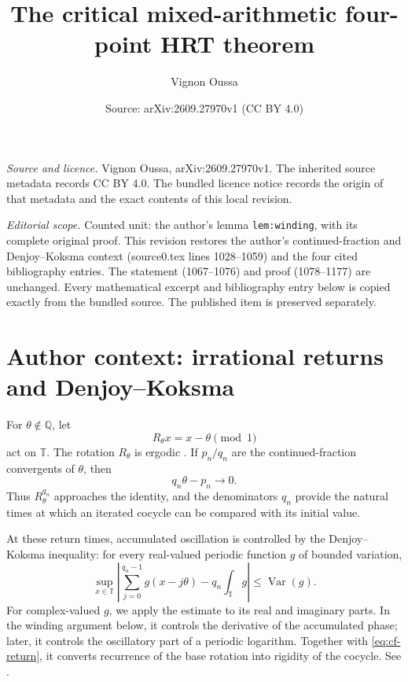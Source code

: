 \documentclass[10pt,a4paper]{amsart}
\title[The critical mixed-arithmetic four-point HRT theorem]{The critical mixed-arithmetic four-point HRT theorem}
\author{Vignon Oussa}
\date{Source: arXiv:2609.27970v1 (CC BY 4.0)}
\newcommand{\Q}{\mathbb{Q}}
\newcommand{\T}{\mathbb{T}}
\newcommand{\Var}{\operatorname{Var}}
\theoremstyle{plain}
\theoremstyle{remark}
\begin{document}
\maketitle

\noindent\emph{Source and licence.} Vignon Oussa, arXiv:2609.27970v1. The inherited source metadata records CC BY 4.0. The bundled licence notice records the origin of that metadata and the exact contents of this local revision.

\noindent\textit{Editorial scope.} Counted unit: the author's lemma \texttt{lem:winding}, with its complete original proof. This revision restores the author's continued-fraction and Denjoy--Koksma context (source0.tex lines 1028--1059) and the four cited bibliography entries. The statement (1067--1076) and proof (1078--1177) are unchanged. Every mathematical excerpt and bibliography entry below is copied exactly from the bundled source. The published item is preserved separately.

\section*{Author context: irrational returns and Denjoy--Koksma}

For \(\theta\notin\Q\), let
\[
  R_\theta x=x-\theta\pmod 1
\]
act on \(\T\). The rotation \(R_\theta\) is ergodic \cite{Petersen}. If
\(p_n/q_n\) are the continued-fraction convergents of \(\theta\), then
\begin{equation}
  q_n\theta-p_n\longrightarrow0.
  \label{eq:cf-return}
\end{equation}
Thus \(R_\theta^{q_n}\) approaches the identity, and the denominators
\(q_n\) provide the natural times at which an iterated cocycle can be
compared with its initial value.

At these return times, accumulated oscillation is controlled by the
Denjoy--Koksma inequality: for every real-valued periodic function \(g\) of
bounded variation,
\begin{equation}
  \sup_{x\in\T}
  \left|
    \sum_{j=0}^{q_n-1}g(x-j\theta)
    -q_n\int_\T g
  \right|
  \leq \Var(g).
  \label{eq:denjoy-koksma}
\end{equation}
For complex-valued \(g\), we apply the estimate to its real and imaginary
parts. In the winding argument below, it controls the derivative of the
accumulated phase; later, it controls the oscillatory part of a periodic
logarithm. Together with \eqref{eq:cf-return}, it converts recurrence of the
base rotation into rigidity of the cocycle. See
\cite{Khinchin,KuipersNiederreiter,KatokHasselblatt}.
\end{document}
